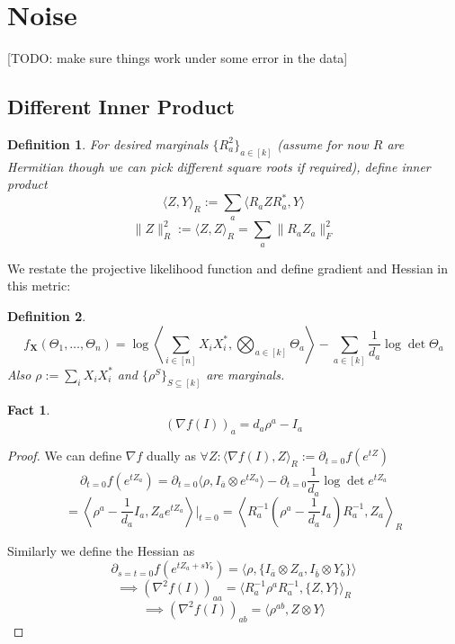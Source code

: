 \documentclass{article}
\newtheorem{fact}[theorem]{Fact}
\newtheorem{definition}{Definition}
\renewcommand{\vec}{\bm}
\newcommand{\TODO}[1]{{\color{blue}[TODO: #1]}}
\begin{document}
\section{Noise}
\TODO{make sure things work under some error in the data}

\subsection{Different Inner Product}

\begin{definition}
For desired marginals $\{R_{a}^{2}\}_{a \in [k]}$ (assume for now $R$ are Hermitian though we can pick different square roots if required), define inner product
\[ \langle Z, Y \rangle_{R} := \sum_{a} \langle R_{a} Z R_{a}^{*}, Y \rangle \]
\[ \|Z\|_{R}^{2} := \langle Z, Z \rangle_{R} = \sum_{a} \|R_{a} Z_{a}\|_{F}^{2}   \]
\end{definition}

We restate the projective likelihood function and define gradient and Hessian in this metric:

\begin{definition} 
\[ f_{\vec X}(\Theta_1, \dots, \Theta_n) = \log \left\langle \sum_{i \in [n]} X_{i} X_{i}^{*},  \bigotimes_{a \in [k]} \Theta_a \right\rangle - \sum_{a \in [k]} \frac{1}{d_a} \log\det \Theta_a  \]
Also $\rho := \sum_{i} X_{i} X_{i}^{*}$ and $\{\rho^{S}\}_{S \subseteq [k]}$ are marginals. 
\end{definition}

\begin{fact}
\[ (\nabla f(I))_{a} = d_{a} \rho^{a} - I_{a}  \]
\end{fact}
\begin{proof}
We can define $\nabla f$ dually as $\forall Z: \langle \nabla f(I), Z \rangle_{R} := \partial_{t=0} f(e^{tZ})$
\[ \partial_{t=0} f(e^{t Z_{a}}) = \partial_{t=0} \langle \rho, I_{\overline{a}} \otimes e^{tZ_{a}}  \rangle - \partial_{t=0} \frac{1}{d_{a}} \log\det e^{t Z_{a}}  \]
\[ = \left\langle \rho^{a} - \frac{1}{d_{a}} I_{a}, Z_{a} e^{t Z_{a}} \right\rangle|_{t=0} = \left\langle R_{a}^{-1} \left( \rho^{a} - \frac{1}{d_{a}} I_{a} \right) R_{a}^{-1}, Z_{a} \right\rangle_{R}   \]

Similarly we define the Hessian as 
\[ \partial_{s=t=0} f(e^{tZ_{a} + sY_{b}}) = \langle \rho, \{ I_{\overline{a}} \otimes Z_{a}, I_{\overline{b}} \otimes Y_{b} \} \rangle   \]
\[ \implies (\nabla^{2} f(I))_{aa} = \langle R_{a}^{-1} \rho^{a} R_{a}^{-1}, \{Z, Y\} \rangle_{R}    \]
\[ \implies (\nabla^{2} f(I))_{ab} = \langle \rho^{ab}, Z \otimes Y \rangle   \]
\end{proof}
\end{document}
